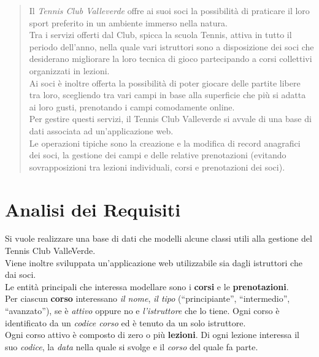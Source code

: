 %
\renewcommand{\chaptername}{}

\begin{abstract}
\justify
Il \textit{Tennis Club Valleverde} offre ai suoi soci la possibilità di praticare il loro sport preferito in un ambiente immerso nella natura. \\
Tra i servizi offerti dal Club, spicca la scuola Tennis, attiva in tutto il periodo dell’anno, nella quale vari istruttori sono a  disposizione dei soci che desiderano migliorare la loro tecnica di gioco partecipando a corsi collettivi organizzati in lezioni. \\
Ai soci è inoltre offerta la possibilità di poter giocare delle partite libere tra loro, scegliendo tra vari campi in base alla superficie che più si adatta ai loro gusti, prenotando i campi comodamente online. \\
Per gestire questi servizi, il Tennis Club Valleverde si avvale di una base di dati associata ad un’applicazione web. \\
Le operazioni tipiche sono la creazione e la modifica di record anagrafici dei soci, la gestione dei campi e delle relative prenotazioni (evitando sovrapposizioni tra lezioni individuali, corsi e prenotazioni dei soci).
\end{abstract}

\chapter{Analisi dei Requisiti} 

Si vuole realizzare una base di dati che modelli alcune classi utili alla gestione del Tennis Club ValleVerde.\\ 
Viene inoltre sviluppata un’applicazione web utilizzabile sia dagli istruttori che dai soci.\\

Le entità principali che interessa modellare sono i \textbf{corsi} e le \textbf{prenotazioni}.\\

Per ciascun \textbf{corso} interessano \textit{il nome}, \textit{il tipo} (“principiante”, “intermedio”, “avanzato”), se è \textit{attivo} oppure no e \textit{l'istruttore} che lo tiene. Ogni corso è identificato da un \textit{codice corso} ed è tenuto da un solo istruttore.\\

Ogni corso attivo è composto di zero o più \textbf{lezioni}. Di ogni lezione interessa il suo \textit{codice}, la \textit{data} nella quale si svolge e il \textit{corso} del quale fa parte.\\

